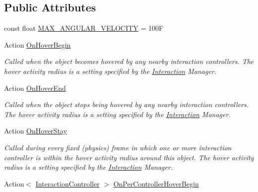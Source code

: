 \subsection*{Public Attributes}
\begin{DoxyCompactItemize}
\item 
const float \mbox{\hyperlink{class_leap_1_1_unity_1_1_interaction_1_1_interaction_behaviour_ae7d4d7f9e7e7a619e26508bb023ae22d}{M\+A\+X\+\_\+\+A\+N\+G\+U\+L\+A\+R\+\_\+\+V\+E\+L\+O\+C\+I\+TY}} = 100F
\item 
Action \mbox{\hyperlink{class_leap_1_1_unity_1_1_interaction_1_1_interaction_behaviour_a9b7a21598c9ef47a9b38290b0ba4fd7c}{On\+Hover\+Begin}}
\begin{DoxyCompactList}\small\item\em Called when the object becomes hovered by any nearby interaction controllers. The hover activity radius is a setting specified by the \mbox{\hyperlink{namespace_leap_1_1_unity_1_1_interaction}{Interaction}} Manager. \end{DoxyCompactList}\item 
Action \mbox{\hyperlink{class_leap_1_1_unity_1_1_interaction_1_1_interaction_behaviour_afd5b0e013d3253ccde7d99f0b6508ae2}{On\+Hover\+End}}
\begin{DoxyCompactList}\small\item\em Called when the object stops being hovered by any nearby interaction controllers. The hover activity radius is a setting specified by the \mbox{\hyperlink{namespace_leap_1_1_unity_1_1_interaction}{Interaction}} Manager. \end{DoxyCompactList}\item 
Action \mbox{\hyperlink{class_leap_1_1_unity_1_1_interaction_1_1_interaction_behaviour_a8aa569872a8b20753ff3c4df34ecc098}{On\+Hover\+Stay}}
\begin{DoxyCompactList}\small\item\em Called during every fixed (physics) frame in which one or more interaction controller is within the hover activity radius around this object. The hover activity radius is a setting specified by the \mbox{\hyperlink{namespace_leap_1_1_unity_1_1_interaction}{Interaction}} Manager. \end{DoxyCompactList}\item 
Action$<$ \mbox{\hyperlink{class_leap_1_1_unity_1_1_interaction_1_1_interaction_controller}{Interaction\+Controller}} $>$ \mbox{\hyperlink{class_leap_1_1_unity_1_1_interaction_1_1_interaction_behaviour_afc1d62d2f597a4f77522ba7f8577c75a}{On\+Per\+Controller\+Hover\+Begin}}

\end{DoxyCompactItemize}
